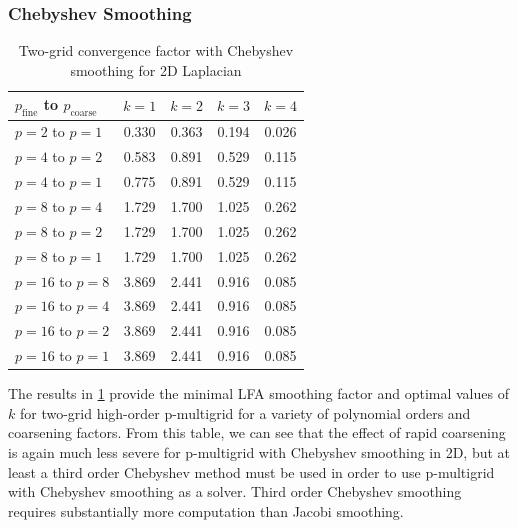 \documentclass[review]{siamart190516}
\begin{document}
\subsubsection{Chebyshev Smoothing}

\begin{table}[ht!]
\begin{center}
\begin{tabular}{l c c c c}
  \toprule
  $p_{\text{fine}}$ to $p_{\text{coarse}}$  &  $k = 1$   &  $k = 2$   &  $k = 3$   &  $k = 4$   \\
  \toprule
  $p = 2$ to $p = 1$   &  0.330  &  0.363  &  0.194  &  0.026  \\
  \midrule
  $p = 4$ to $p = 2$   &  0.583  &  0.891  &  0.529  &  0.115  \\
  $p = 4$ to $p = 1$   &  0.775  &  0.891  &  0.529  &  0.115  \\
  \midrule
  $p = 8$ to $p = 4$   &  1.729  &  1.700  &  1.025  &  0.262  \\
  $p = 8$ to $p = 2$   &  1.729  &  1.700  &  1.025  &  0.262  \\
  $p = 8$ to $p = 1$   &  1.729  &  1.700  &  1.025  &  0.262  \\
  \midrule
  $p = 16$ to $p = 8$  &  3.869  &  2.441  &  0.916  &  0.085  \\
  $p = 16$ to $p = 4$  &  3.869  &  2.441  &  0.916  &  0.085  \\
  $p = 16$ to $p = 2$  &  3.869  &  2.441  &  0.916  &  0.085  \\
  $p = 16$ to $p = 1$  &  3.869  &  2.441  &  0.916  &  0.085  \\
  \bottomrule
\end{tabular}
\end{center}
\caption{Two-grid convergence factor with Chebyshev smoothing for 2D Laplacian}
\label{table:two_grid_2d_chebyshev}
\end{table}

The results in \cref{table:two_grid_2d_chebyshev} provide the minimal LFA smoothing factor and optimal values of $k$ for two-grid high-order p-multigrid for a variety of polynomial orders and coarsening factors.
From this table, we can see that the effect of rapid coarsening is again much less severe for p-multigrid with Chebyshev smoothing in 2D, but at least a third order Chebyshev method must be used in order to use p-multigrid with Chebyshev smoothing as a solver.
Third order Chebyshev smoothing requires substantially more computation than Jacobi smoothing.
\end{document}
